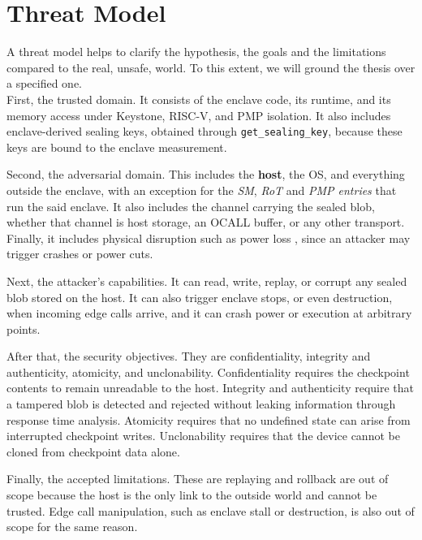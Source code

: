 \documentclass[11pt,a4paper]{report}
\begin{document}
\section{Threat Model}
\label{sec:threat-model}
A threat model helps to clarify the hypothesis, the goals and the limitations compared to the real, unsafe, world. 
To this extent, we will ground the thesis over a specified one.
\\  

First, the trusted domain. 
It consists of the enclave code, its runtime, and its memory access under Keystone, RISC-V, and PMP isolation. 
It also includes enclave-derived sealing keys, obtained through \texttt{get\_sealing\_key}, because these keys are bound to the enclave measurement.

Second, the adversarial domain. 
This includes the \textbf{host}, the OS, and everything outside the enclave, with an exception for the \textit{SM}, \textit{RoT} and \textit{PMP entries} that run the said enclave. 
It also includes the channel carrying the sealed blob, whether that channel is host storage, an OCALL buffer, or any other transport. 
Finally, it includes physical disruption such as power loss \cite{sdrad, ARM-TrustZone-CortexM}, since an attacker may trigger crashes or power cuts.

Next, the attacker's capabilities. 
It can read, write, replay, or corrupt any sealed blob stored on the host. 
It can also trigger enclave stops, or even destruction, when incoming edge calls arrive, and it can crash power or execution at arbitrary points.

After that, the security objectives. 
They are confidentiality, integrity and authenticity, atomicity, and unclonability. 
Confidentiality requires the checkpoint contents to remain unreadable to the host. 
Integrity and authenticity require that a tampered blob is detected and rejected without leaking information through response time analysis. 
Atomicity requires that no undefined state can arise from interrupted checkpoint writes. 
Unclonability requires that the device cannot be cloned from checkpoint data alone.

Finally, the accepted limitations. 
These are replaying and rollback are out of scope because the host is the only link to the outside world and cannot be trusted.
Edge call manipulation, such as enclave stall or destruction, is also out of scope for the same reason.
\end{document}
